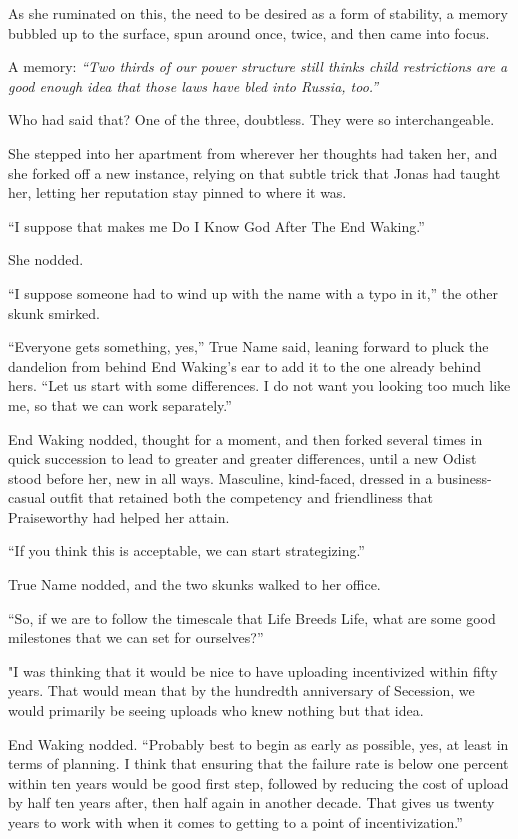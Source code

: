 As she ruminated on this, the need to be desired as a form of stability, a memory bubbled up to the surface, spun around once, twice, and then came into focus.

A memory: \emph{``Two thirds of our power structure still thinks child restrictions are a good enough idea that those laws have bled into Russia, too.''}

Who had said that? One of the three, doubtless. They were so interchangeable.

She stepped into her apartment from wherever her thoughts had taken her, and she forked off a new instance, relying on that subtle trick that Jonas had taught her, letting her reputation stay pinned to where it was.

``I suppose that makes me Do I Know God After The End Waking.''

She nodded.

``I suppose someone had to wind up with the name with a typo in it,'' the other skunk smirked.

``Everyone gets something, yes,'' True Name said, leaning forward to pluck the dandelion from behind End Waking's ear to add it to the one already behind hers. ``Let us start with some differences. I do not want you looking too much like me, so that we can work separately.''

End Waking nodded, thought for a moment, and then forked several times in quick succession to lead to greater and greater differences, until a new Odist stood before her, new in all ways. Masculine, kind-faced, dressed in a business-casual outfit that retained both the competency and friendliness that Praiseworthy had helped her attain.

``If you think this is acceptable, we can start strategizing.''

True Name nodded, and the two skunks walked to her office.

``So, if we are to follow the timescale that Life Breeds Life, what are some good milestones that we can set for ourselves?''

"I was thinking that it would be nice to have uploading incentivized within fifty years. That would mean that by the hundredth anniversary of Secession, we would primarily be seeing uploads who knew nothing but that idea.

End Waking nodded. ``Probably best to begin as early as possible, yes, at least in terms of planning. I think that ensuring that the failure rate is below one percent within ten years would be good first step, followed by reducing the cost of upload by half ten years after, then half again in another decade. That gives us twenty years to work with when it comes to getting to a point of incentivization.''

